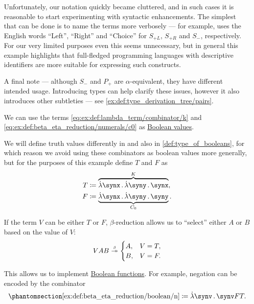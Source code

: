 \begin{example}
\begin{thmenum}
    Unfortunately, our notation quickly became cluttered, and in such cases it is reasonable to start experimenting with syntactic enhancements. The simplest that can be done is to name the terms more verbosely --- for example, \cite{MathOF:product_type_in_simply_typed_lambda_terms} uses the English words \enquote{Left}, \enquote{Right} and \enquote{Choice} for \( S_{+L} \), \( S_{+R} \) and \( S_- \), respectively. For our very limited purposes even this seems unnecessary, but in general this example highlights that full-fledged programming languages with descriptive identifiers are more suitable for expressing such constructs.

    A final note --- although \( S_- \) and \( P_+ \) are \( \alpha \)-equivalent, they have different intended usage. Introducing types can help clarify these issues, however it also introduces other subtleties --- see \cref{ex:def:type_derivation_tree/pairs}.

     We can use the terms \ref{eq:ex:def:lambda_term/combinator/k} and \ref{eq:ex:def:beta_eta_reduction/numerals/c0} as \hyperref[con:boolean_value]{Boolean values}.

    We will define truth values differently in  and also in \cref{def:type_of_booleans}, for which reason we avoid using these combinators as boolean values more generally, but for the purposes of this example define \( T \) and \( F \) as
    \begin{align*}
      T &\coloneqq \overbrace{\qabs \synx \qabs \syny \synx}^K, \\
      F &\coloneqq \underbrace{\qabs \synx \qabs \syny \syny}_{C_0}.
    \end{align*}

    If the term \( V \) can be either \( T \) or \( F \), \( \beta \)-reduction allows us to \enquote{select} either \( A \) or \( B \) based on the value of \( V \):
    \begin{equation}\label{ex:def:beta_eta_reduction/boolean/if}
      VAB \bred* \begin{cases}
        A, &V = T, \\
        B, &V = F.
      \end{cases}
    \end{equation}

    This allows us to implement \hyperref[def:boolean_function]{Boolean functions}. For example, negation can be encoded by the combinator
    \begin{equation*}\taglabel[N]{ex:def:beta_eta_reduction/boolean/n}
      \ref{ex:def:beta_eta_reduction/boolean/n} \coloneqq \qabs \synv \synv F T.
    \end{equation*}


\end{thmenum}
\end{example}
